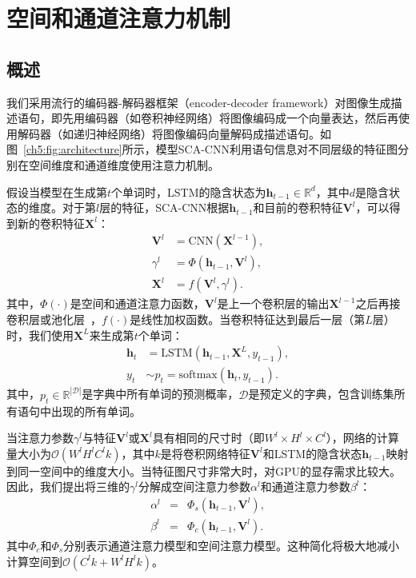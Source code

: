 \section{空间和通道注意力机制}

\subsection{概述}
我们采用流行的编码器-解码器框架（encoder-decoder framework）对图像生成描述语句，即先用编码器（如卷积神经网络）将图像编码成一个向量表达，然后再使用解码器（如递归神经网络）将图像编码向量解码成描述语句。如图~\ref{ch5:fig:architecture}所示，模型SCA-CNN利用语句信息对不同层级的特征图分别在空间维度和通道维度使用注意力机制。

假设当模型在生成第$t$个单词时，LSTM的隐含状态为$\bm{h}_{t-1}\in\mathbb{R}^d$，其中$d$是隐含状态的维度。对于第$l$层的特征，SCA-CNN根据$\bm{h}_{t-1}$和目前的卷积特征$\bm{V}^l$，可以得到新的卷积特征$\bm{X}^l$：
\begin{equation} \label{ch5:eq:eq_1}
\begin{split}
\bm{V}^l &= \textrm{CNN}\left(\bm{X}^{l-1}\right),\\
\gamma^l &= \Phi\left(\bm{h}_{t-1},\bm{V}^l\right),\\
\bm{X}^l &= f\left(\bm{V}^{l},\gamma^{l}\right).
\end{split}
\end{equation}
其中，$\Phi(\cdot)$是空间和通道注意力函数，$\bm{V}^l$是上一个卷积层的输出$\bm{X}^{l-1}$之后再接卷积层或池化层~\cite{simonyan2015very,he2016deep}，$f(\cdot)$是线性加权函数。当卷积特征达到最后一层（第$L$层）时，我们使用$\bm{X}^L$来生成第$t$个单词：
\begin{equation}
\begin{split}
\bm{h}_t &= \textrm{LSTM}\left(\bm{h}_{t-1},\bm{X}^L,y_{t-1}\right),\\
y_t & \sim p_t = \textrm{softmax} \left(\bm{h}_t, y_{t-1} \right).
\end{split}
\end{equation}
其中，$p_t \in \mathbb{R}^{|\mathcal{D}|}$是字典中所有单词的预测概率，$\mathcal{D}$是预定义的字典，包含训练集所有语句中出现的所有单词。

当注意力参数$\gamma^l$与特征$\bm{V}^l$或$\bm{X}^l$具有相同的尺寸时（即$W^l\times H^l\times C^l$），网络的计算量大小为$\mathcal{O}(W^lH^lC^lk)$，其中$k$是将卷积网络特征$\bm{V}^l$和LSTM的隐含状态$\bm{h}_{t-1}$映射到同一空间中的维度大小。当特征图尺寸非常大时，对GPU的显存需求比较大。因此，我们提出将三维的$\gamma^l$分解成空间注意力参数$\alpha^l$和通道注意力参数$\beta^l$：
\begin{eqnarray}
\alpha^l &= & \Phi_s \left(\bm{h}_{t-1},\bm{V}^l\right),  \label{ch5:eq:eq_3} \\
\beta^l &= & \Phi_c \left(\bm{h}_{t-1},\bm{V}^l\right). \label{ch5:eq:eq_4}
\end{eqnarray}
其中$\Phi_c$和$\Phi_s$分别表示通道注意力模型和空间注意力模型。这种简化将极大地减小计算空间到$\mathcal{O}(C^lk+W^lH^lk)$。


